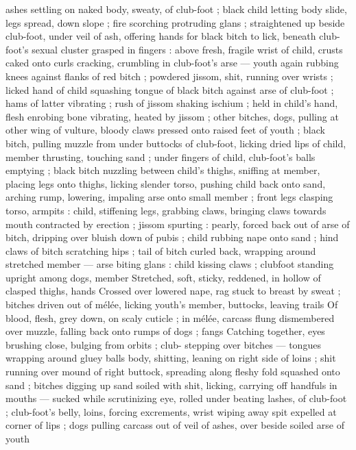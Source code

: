 ashes settling on naked body, sweaty, of club-foot ; black child 
letting body slide, legs spread, down slope ; fire scorching 
protruding glans ; straightened up beside club-foot, under veil of 
ash, offering hands for black bitch to lick, beneath club-foot's sexual 
cluster grasped in fingers : above fresh, fragile wrist of child, crusts 
caked onto curls cracking, crumbling in club-foot's arse --- youth 
again rubbing knees against flanks of red bitch ; powdered jissom, 
shit, running over wrists ; licked hand of child squashing tongue of 
black bitch against arse of club-foot ; hams of latter vibrating ; rush 
of jissom shaking ischium ; held in child's hand, flesh enrobing bone 
vibrating, heated by jissom ; other bitches, dogs, pulling at other 
wing of vulture, bloody claws pressed onto raised feet of youth ; 
black bitch, pulling muzzle from under buttocks of club-foot, licking 
dried lips of child, member thrusting, touching sand ; under fingers 
of child, club-foot's balls emptying ; black bitch nuzzling between 
child's thighs, sniffing at member, placing legs onto thighs, licking 
slender torso, pushing child back onto sand, arching rump, lowering, 
impaling arse onto small member ; front legs clasping torso, armpits 
: child, stiffening legs, grabbing claws, bringing claws towards mouth 
contracted by erection ; jissom spurting : pearly, forced back out of 
arse of bitch, dripping over bluish down of pubis ; child rubbing 
nape onto sand ; hind claws of bitch scratching hips ; tail of bitch 
curled back, wrapping around stretched member --- arse biting glans 
: child kissing claws ; clubfoot standing upright among dogs, member 
Stretched, soft, sticky, reddened, in hollow of clasped thighs, hands 
Crossed over lowered nape, rag stuck to breast by sweat ; bitches 
driven out of mélée, licking youth's member, buttocks, leaving trails 
Of blood, flesh, grey down, on scaly cuticle ; in mélée, carcass flung 
dismembered over muzzle, falling back onto rumps of dogs ; fangs 
Catching together, eyes brushing close, bulging from orbits ; club- 
stepping over bitches --- tongues wrapping around gluey balls 
body, shitting, leaning on right side of loins ; shit running over 
mound of right buttock, spreading along fleshy fold squashed onto 
sand ; bitches digging up sand soiled with shit, licking, carrying off 
handfuls in mouths --- sucked while scrutinizing eye, rolled under 
beating lashes, of club-foot ; club-foot's belly, loins, forcing 
excrements, wrist wiping away spit expelled at corner of lips ; dogs 
pulling carcass out of veil of ashes, over beside soiled arse of youth 
